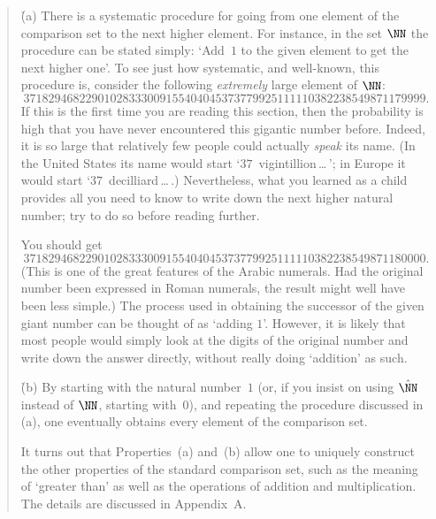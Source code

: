 {\begin{quotation}
{        \h (a) There is a systematic procedure for going from one element of the comparison set to the next higher element.
    For instance, in the set ${\NN}$ the procedure can be stated simply:
    `Add~$1$ to the given element to get the next higher one'.
    To see just how systematic, and well-known, this procedure is, consider the following {\em extremely} large element of ${\NN}$:
        \begin{displaymath}
        37182946822901028333009155404045373779925111110382238549871179999.
        \end{displaymath}
    If this is the first time you are reading this section, then the probability is high that you have never encountered this gigantic number before.
    Indeed, it is so large that relatively few people could actually {\em speak} its name.
    (In the United States its name would start `$37$~vigintillion\,{\ldots}\,'; in Europe it would start `$37$~decilliard\,{\ldots}\,.)
    Nevertheless, what you learned as a child provides all you need to know to write down the next higher natural number; try to do so before reading further.

\V
\V

        You should get
        \begin{displaymath}
        37182946822901028333009155404045373779925111110382238549871180000.
        \end{displaymath}
    (This is one of the great features of the Arabic numerals. Had the original number been expressed in Roman numerals, the result might well have been less simple.)
    The process used in obtaining the successor of the given giant number can be thought of as `adding $1$'.
    However, it is likely that most people would simply look at the digits of the original number and write down the answer directly, without really doing `addition' as such.

        \h (b) By starting with the natural number~$1$ (or, if you insist on using $\hat{{\NN}}$ instead of ${\NN}$, starting with~$0$),
    and repeating the procedure discussed in (a), one eventually obtains every element of the comparison set.

\noindent It turns out that Properties~(a) and~(b) allow one to uniquely construct the other properties of the standard comparison set,
    such as the meaning of `greater than' as well as the operations of addition and multiplication.
    The details are discussed in Appendix~A.
}%
\end{quotation}

}
